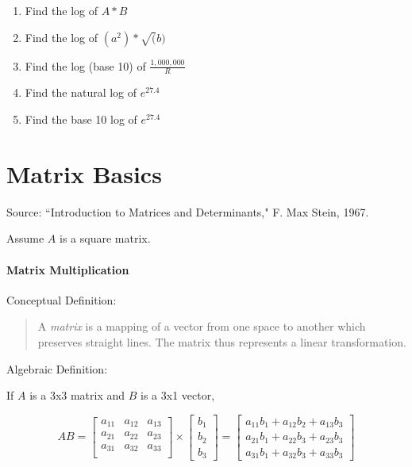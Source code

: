 \begin{enumerate}

\item  Find the log of $A*B$

\item  Find the log of $(a^2) * \sqrt(b)$

\item  Find the log (base 10) of $\frac{1,000,000}{R}$

\item  Find the natural log of $e^{27.4}$

\item  Find the base 10 log of $e^{27.4}$


\end{enumerate}






\newpage
\section{Matrix Basics}\label{LinearAlgebraBasics}

Source: ``Introduction to Matrices and Determinants," F. Max Stein, 1967.

Assume $A$ is a square matrix.


\paragraph{Matrix Multiplication}
Conceptual Definition:
\begin{quotation}
A {\it matrix} is a mapping of a vector from one space to another which preserves straight lines.  The matrix thus represents a linear transformation.
\end{quotation}

Algebraic Definition:

If $A$ is a 3x3 matrix and $B$ is a 3x1 vector,

\[
AB =
\left[
\begin{array}{ccc}
a_{11}	& a_{12} & a_{13} \\
a_{21}  & a_{22} & a_{23} \\
a_{31}  & a_{32} & a_{33} \\
\end{array}
\right]
\times
\left[
\begin{array}{c}
b_1 \\ b_2 \\ b_3
\end{array}
\right]
= \left[
\begin{array}{c}
a_{11}b_1 + a_{12}b_2 + a_{13}b_3 \\
a_{21}b_1 + a_{22}b_3 + a_{23}b_3 \\
a_{31}b_1 + a_{32}b_3 + a_{33}b_3
\end{array}
\right]
\]

